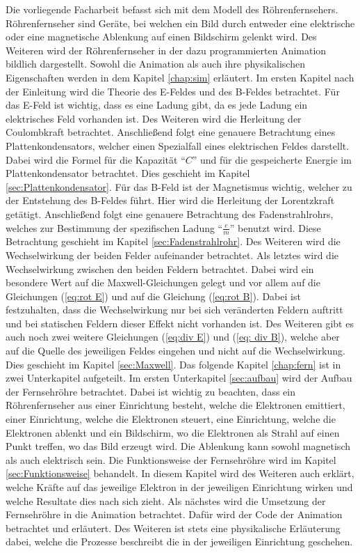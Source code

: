 Die vorliegende Facharbeit befasst sich mit dem Modell des Röhrenfernsehers.
Röhrenfernseher sind Geräte, bei welchen ein Bild durch entweder eine elektrische oder eine magnetische Ablenkung auf einen Bildschirm gelenkt wird.
Des Weiteren wird der Röhrenfernseher in der dazu programmierten Animation bildlich dargestellt.
Sowohl die Animation als auch ihre physikalischen Eigenschaften werden in dem Kapitel \ref{chap:sim} erläutert.
Im ersten Kapitel nach der Einleitung wird die Theorie des E-Feldes und des B-Feldes betrachtet.
Für das E-Feld ist wichtig, dass es eine Ladung gibt, da es jede Ladung ein elektrisches Feld vorhanden ist.
Des Weiteren wird die Herleitung der Coulombkraft betrachtet.
Anschließend folgt eine genauere Betrachtung eines Plattenkondensators, welcher einen Spezialfall eines elektrischen Feldes darstellt.
Dabei wird die Formel für die Kapazität "`$C$"' und für die gespeicherte Energie im Plattenkondensator betrachtet.
Dies geschieht im Kapitel \ref{sec:Plattenkondensator}.
Für das B-Feld ist der Magnetismus wichtig, welcher zu der Entstehung des B-Feldes führt.
Hier wird die Herleitung der Lorentzkraft getätigt.
Anschließend folgt eine genauere Betrachtung des Fadenstrahlrohrs, welches zur Bestimmung der spezifischen Ladung "`$\frac{e}{m}$"' benutzt wird.
Diese Betrachtung geschieht im Kapitel \ref{sec:Fadenstrahlrohr}.
Des Weiteren wird die Wechselwirkung der beiden Felder aufeinander betrachtet.
Als letztes wird die Wechselwirkung zwischen den beiden Feldern betrachtet.
Dabei wird ein besondere Wert auf die Maxwell-Gleichungen gelegt und vor allem auf die Gleichungen (\ref{eq:rot E}) und auf die Gleichung (\ref{eq:rot B}).
Dabei ist festzuhalten, dass die Wechselwirkung nur bei sich veränderten Feldern auftritt und bei statischen Feldern dieser Effekt nicht vorhanden ist.
Des Weiteren gibt es auch noch zwei weitere Gleichungen (\ref{eq:div E}) und (\ref{eq: div B}), welche aber auf die Quelle des jeweiligen Feldes eingehen und nicht auf die Wechselwirkung.
Dies geschieht im Kapitel \ref{sec:Maxwell}.
Das folgende Kapitel \ref{chap:fern} ist in zwei Unterkapitel aufgeteilt.
Im ersten Unterkapitel \ref{sec:aufbau} wird der Aufbau der Fernsehröhre betrachtet.
Dabei ist wichtig zu beachten, dass ein Röhrenfernseher aus einer Einrichtung besteht, welche die Elektronen emittiert, einer Einrichtung, welche die Elektronen steuert, eine Einrichtung, welche die Elektronen ablenkt und ein Bildschirm, wo die Elektronen als Strahl auf einen Punkt treffen, wo das Bild erzeugt wird.
Die Ablenkung kann sowohl magnetisch als auch elektrisch sein.
Die Funktionsweise der Fernsehröhre wird im Kapitel \ref{sec:Funktionsweise} behandelt.
In diesem Kapitel wird des Weiteren auch erklärt, welche Kräfte auf das jeweilige Elektron in der jeweiligen Einrichtung wirken und welche Resultate dies nach sich zieht.
Als nächstes wird die Umsetzung der Fernsehröhre in die Animation betrachtet.
Dafür wird der Code der Animation betrachtet und erläutert.
Des Weiteren ist stets eine physikalische Erläuterung dabei, welche die Prozesse beschreibt die in der jeweiligen Einrichtung geschehen.
